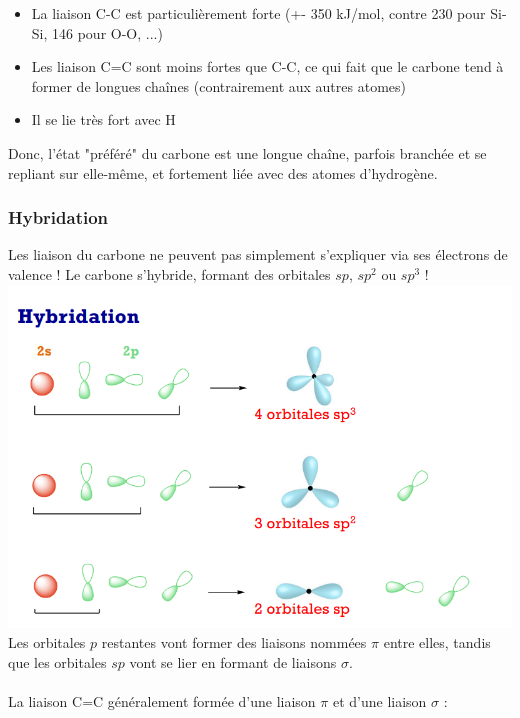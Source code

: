 \documentclass{article}
\begin{document}
            \begin{itemize}
                \item La liaison C-C est particulièrement forte (+- 350 kJ/mol, contre 230 pour Si-Si, 146 pour O-O, ...)
                \item Les liaison C=C sont moins fortes que C-C, ce qui fait que le carbone tend 
                    à former de longues chaînes (contrairement aux autres atomes)
                \item Il se lie très fort avec H
            \end{itemize}
            Donc, l'état "préféré" du carbone est une longue chaîne, parfois branchée 
            et se repliant sur elle-même, et fortement liée avec des atomes d'hydrogène.
        
        \subsubsection{Hybridation}
            Les liaison du carbone ne peuvent pas simplement 
            s'expliquer via ses électrons de valence !
            Le carbone s'hybride, formant des orbitales $sp$, $sp^2$ ou $sp^3$ ! \\
            \includegraphics[scale=.5]{hybridation_carbone.png} \\
            Les orbitales $p$ restantes vont former des liaisons 
            nommées $\pi$ entre elles, tandis que les orbitales $sp$ 
            vont se lier en formant de liaisons $\sigma$. \\\\
            La liaison C=C généralement formée d'une liaison $\pi$ 
            et d'une liaison $\sigma$ :\\
\end{document}
